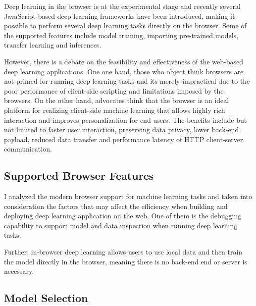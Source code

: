 Deep learning in the browser is at the experimental stage and recently several JavaScript-based deep learning frameworks have been introduced, making it possible to perform several deep learning tasks directly on the browser. Some of the supported features include model training, importing pre-trained models, transfer learning and inferences.

However, there is a debate on the feasibility and effectiveness of the web-based deep learning applications. One one hand, those who object think browsers are not primed for running deep learning tasks and its merely impractical due to the poor performance of client-side scripting and limitations imposed by the browsers. On the other hand, advocates think that the browser is an ideal platform for realizing client-side machine learning that allows highly rich interaction and improves personalization for end users. The benefits include but not limited to faster user interaction, preserving data privacy, lower back-end payload, reduced data transfer and performance latency of HTTP client-server communication.

\subsection{Supported Browser Features}
I analyzed the modern browser support for machine learning tasks and taken into consideration the factors that may affect the efficiency when building and deploying deep learning application on the web. One of them is the debugging capability to support model and data inspection when running deep learning tasks.

Further, in-browser deep learning allows users to use local data and then train the model directly in the browser, meaning there is no back-end end or server is necessary. 
\subsection{Model Selection}

